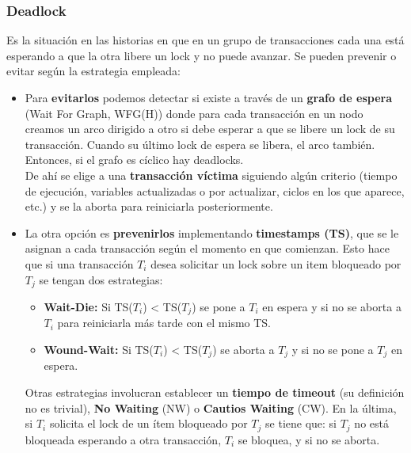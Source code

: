 \subsubsection*{Deadlock}
Es la situación en las historias en que en un grupo de transacciones cada una está esperando a que la otra libere un lock y no puede avanzar. Se pueden prevenir o evitar según la estrategia empleada:
\begin{itemize}
    \item Para \textbf{evitarlos} podemos detectar si existe a través de un \textbf{grafo de espera} (Wait For Graph, WFG(H)) donde para cada transacción en un nodo creamos un arco dirigido a otro si debe esperar a que se libere un lock de su transacción. Cuando su último lock de espera se libera, el arco también. Entonces, si el grafo es cíclico hay deadlocks. \\
    De ahí se elige a una \textbf{transacción víctima} siguiendo algún criterio (tiempo de ejecución, variables actualizadas o por actualizar, ciclos en los que aparece, etc.) y se la aborta para reiniciarla posteriormente.
    \item La otra opción es \textbf{prevenirlos} implementando \textbf{timestamps (TS)}, que se le asignan a cada transacción según el momento en que comienzan. Esto hace que si una transacción $T_i$ desea solicitar un lock sobre un item bloqueado por $T_j$ se tengan dos estrategias:
    \begin{itemize}
        \item \textbf{Wait-Die:} Si TS($T_i$) < TS($T_j$) se pone a $T_i$ en espera y si no se aborta a $T_i$ para reiniciarla más tarde con el mismo TS.
        \item \textbf{Wound-Wait:} Si TS($T_i$) < TS($T_j$) se aborta a $T_j$ y si no se pone a $T_j$ en espera.
    \end{itemize}
    Otras estrategias involucran establecer un \textbf{tiempo de timeout} (su definición no es trivial), \textbf{No Waiting} (NW) o \textbf{Cautios Waiting} (CW). En la última, si $T_i$ solicita el lock de un ítem bloqueado por $T_j$ se tiene que: si $T_j$ no está bloqueada esperando a otra transacción, $T_i$ se bloquea, y si no se aborta.
\end{itemize}

